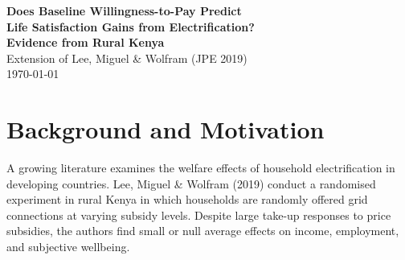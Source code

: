 \documentclass[12pt]{article}
\begin{document}
\begin{titlepage}
\begin{center}
\vspace*{1.5cm}
{\large \textbf{Does Baseline Willingness-to-Pay Predict\\[0.3em]
Life Satisfaction Gains from Electrification?\\[0.3em]
Evidence from Rural Kenya}}\\[2em]
{\normalsize Extension of Lee, Miguel \& Wolfram (JPE 2019)}\\[1.5em]
{\normalsize \today}
\end{center}

\vspace{2em}
\begin{abstract}
\noindent
We ask whether a household's stated willingness-to-pay (WTP) for a grid
electricity connection at baseline predicts the life satisfaction gains it
realises from connection. Using data from the randomised experiment of
Lee, Miguel \& Wolfram (2019), we merge a contingent-valuation WTP measure
from the 2014 baseline survey with subjective wellbeing outcomes from two
follow-up rounds (2016, 2017). We estimate heterogeneous intent-to-treat
(ITT) effects on a normalised life satisfaction index and a
perceptions-of-security index, interacting the treatment indicator with a
binary high-WTP variable. The differential ITT coefficient is small
(${-}0.018$ standard deviations) and statistically insignificant in all
specifications. After Benjamini--Hochberg correction, neither outcome
survives multiple-testing adjustment ($q \geq 0.95$). These results are
consistent with the null average wellbeing effects reported by the original
paper and suggest that prior expectations, as proxied by stated WTP, do not
meaningfully moderate the wellbeing impact of grid connection.
\end{abstract}
\end{titlepage}

\section{Background and Motivation}
\label{sec:background}

A growing literature examines the welfare effects of household
electrification in developing countries. Lee, Miguel \& Wolfram (2019)
conduct a randomised experiment in rural Kenya in which households are
randomly offered grid connections at varying subsidy levels. Despite large
take-up responses to price subsidies, the authors find small or null
average effects on income, employment, and subjective wellbeing.
\end{document}
